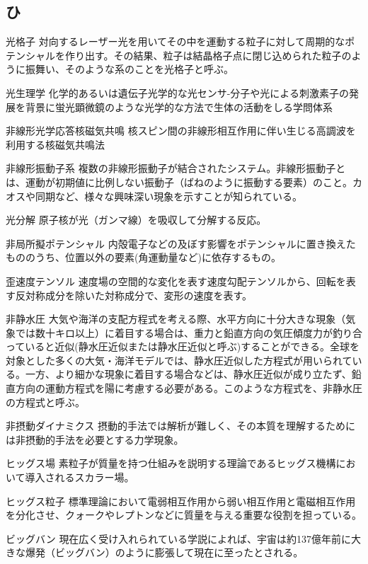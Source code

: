 \begin{用語集}
\section{ひ}
\item{光格子}{}
{対向するレーザー光を用いてその中を運動する粒子に対して周期的なポテンシャルを作り出す。その結果、粒子は結晶格子点に閉じ込められた粒子のように振舞い、そのような系のことを光格子と呼ぶ。}
\item{光生理学}{}
{化学的あるいは遺伝子光学的な光センサ-分子や光による刺激素子の発展を背景に蛍光顕微鏡のような光学的な方法で生体の活動をしる学問体系}
\item{非線形光学応答核磁気共鳴}{}
{核スピン間の非線形相互作用に伴い生じる高調波を利用する核磁気共鳴法}
\item{非線形振動子系}{}
{複数の非線形振動子が結合されたシステム。非線形振動子とは、運動が初期値に比例しない振動子（ばねのように振動する要素）のこと。カオスや同期など、様々な興味深い現象を示すことが知られている。}
\item{光分解}{}
{原子核が光（ガンマ線）を吸収して分解する反応。}
\item{非局所擬ポテンシャル}{}
{内殻電子などの及ぼす影響をポテンシャルに置き換えたもののうち、位置以外の要素(角運動量など)に依存するもの。}
\item{歪速度テンソル}{}
{速度場の空間的な変化を表す速度勾配テンソルから、回転を表す反対称成分を除いた対称成分で、変形の速度を表す。}
\item{非静水圧}{}
{大気や海洋の支配方程式を考える際、水平方向に十分大きな現象（気象では数十キロ以上）に着目する場合は、重力と鉛直方向の気圧傾度力が釣り合っていると近似(静水圧近似または静水圧近似と呼ぶ)することができる。全球を対象とした多くの大気・海洋モデルでは、静水圧近似した方程式が用いられている。一方、より細かな現象に着目する場合などは、静水圧近似が成り立たず、鉛直方向の運動方程式を陽に考慮する必要がある。このような方程式を、非静水圧の方程式と呼ぶ。}
\item{非摂動ダイナミクス}{}
{摂動的手法では解析が難しく、その本質を理解するためには非摂動的手法を必要とする力学現象。}
\item{ヒッグス場}{}
{素粒子が質量を持つ仕組みを説明する理論であるヒッグス機構において導入されるスカラー場。}
\item{ヒッグス粒子}{}
{標準理論において電弱相互作用から弱い相互作用と電磁相互作用を分化させ、クォークやレプトンなどに質量を与える重要な役割を担っている。}
\item{ビッグバン}{}
{現在広く受け入れられている学説によれば、宇宙は約137億年前に大きな爆発（ビッグバン）のように膨張して現在に至ったとされる。}

\end{用語集}
